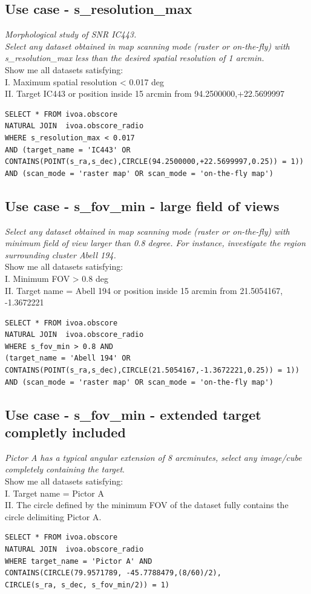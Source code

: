 \subsection{Use case - s\_resolution\_max}
\label{sec:s_resolution_max}
\textit{Morphological study of SNR IC443. \\
Select any dataset obtained in map scanning mode (raster or on-the-fly) with s\_resolution\_max less than the desired spatial resolution of 1 arcmin.}\\
Show me all datasets satisfying: \\
I. Maximum spatial resolution < 0.017 deg \\
II. Target IC443 or position inside 15 arcmin from 94.2500000,+22.5699997 

\begin{verbatim}
SELECT * FROM ivoa.obscore
NATURAL JOIN  ivoa.obscore_radio 
WHERE s_resolution_max < 0.017 
AND (target_name = 'IC443' OR
CONTAINS(POINT(s_ra,s_dec),CIRCLE(94.2500000,+22.5699997,0.25)) = 1)) 
AND (scan_mode = 'raster map' OR scan_mode = 'on-the-fly map')
\end{verbatim}

\subsection{Use case - s\_fov\_min - large field of views}
\label{sec:s_fov_min}
\textit{Select any dataset obtained in map scanning mode (raster or on-the-fly) with minimum field of view larger than 0.8 degree. For instance, investigate the region surrounding cluster Abell 194.}\\
Show me all datasets satisfying:\\
I. Minimum FOV > 0.8 deg \\
II. Target name = Abell 194 or position inside 15 arcmin from 21.5054167, -1.3672221 
\begin{verbatim}
SELECT * FROM ivoa.obscore
NATURAL JOIN  ivoa.obscore_radio 
WHERE s_fov_min > 0.8 AND
(target_name = 'Abell 194' OR
CONTAINS(POINT(s_ra,s_dec),CIRCLE(21.5054167,-1.3672221,0.25)) = 1)) 
AND (scan_mode = 'raster map' OR scan_mode = 'on-the-fly map')
\end{verbatim}

\subsection{Use case - s\_fov\_min - extended target completly included}
\label{sec:s_fov_max}
\textit{Pictor A has a typical angular extension  of 8 arcminutes, select any image/cube completely containing the target}.\\
Show me all datasets satisfying: \\
I. Target name = Pictor A \\
II. The circle defined by the minimum FOV of the dataset fully contains the circle delimiting Pictor A. 
\begin{verbatim}
SELECT * FROM ivoa.obscore
NATURAL JOIN  ivoa.obscore_radio 
WHERE target_name = 'Pictor A' AND
CONTAINS(CIRCLE(79.9571789, -45.7788479,(8/60)/2),
CIRCLE(s_ra, s_dec, s_fov_min/2)) = 1)
\end{verbatim}


